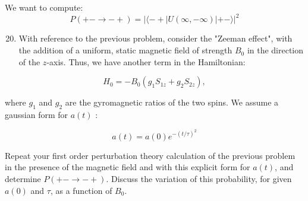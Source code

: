\documentclass[12pt]{article}
\begin{document}
\subsection{}
We want to compute:
\begin{equation}
  P(+-\rightarrow-+)=|\langle-+|U(\infty,-\infty)|+-\rangle|^{2}
\end{equation}
\begin{enumerate}
  \setcounter{enumi}{19}
  \item With reference to the previous problem, consider the "Zeeman effect", with the addition of a uniform, static magnetic field of strength $B_{0}$ in the direction of the $z$-axis. Thus, we have another term in the Hamiltonian:
\end{enumerate}

$$
H_{0}=-B_{0}\left(g_{1} S_{1 z}+g_{2} S_{2 z}\right),
$$

where $g_{1}$ and $g_{2}$ are the gyromagnetic ratios of the two spins. We assume a gaussian form for $a(t)$ :

$$
a(t)=a(0) e^{-(t / \tau)^{2}}
$$

Repeat your first order perturbation theory calculation of the previous problem in the presence of the magnetic field and with this explicit form for $a(t)$, and determine $P(+-\rightarrow-+)$. Discuss the variation of this probability, for given $a(0)$ and $\tau$, as a function of $B_{0}$.
\end{document}
